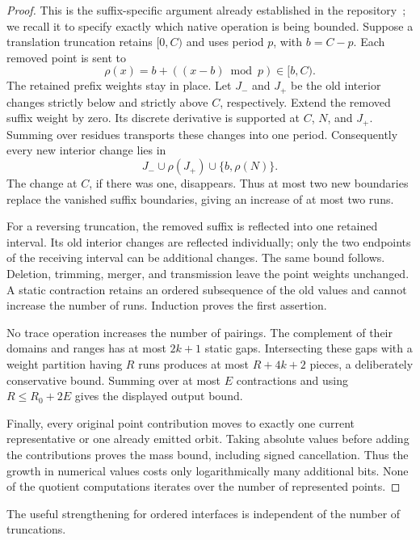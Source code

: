 \begin{proof}
This is the suffix-specific argument already established in the
repository~\cite{ProveIt2026}; we recall it to specify exactly which native
operation is being bounded.  Suppose a translation truncation retains
$[0,C)$ and uses period $p$, with $b=C-p$.  Each removed point is sent to
\[
               \rho(x)=b+((x-b)\bmod p)\in[b,C).
\]
The retained prefix weights stay in place.  Let $J_-$ and $J_+$ be the old
interior changes strictly below and strictly above $C$, respectively.
Extend the removed suffix weight by zero.  Its discrete derivative is
supported at $C$, $N$, and $J_+$.  Summing over residues transports these
changes into one period.  Consequently every new interior change lies in
\[
                   J_-\cup\rho(J_+)\cup\{b,\rho(N)\}.
\]
The change at $C$, if there was one, disappears.  Thus at most two new
boundaries replace the vanished suffix boundaries, giving an increase of at
most two runs.

For a reversing truncation, the removed suffix is reflected into one
retained interval.  Its old interior changes are reflected individually;
only the two endpoints of the receiving interval can be additional changes.
The same bound follows.  Deletion, trimming, merger, and transmission leave
the point weights unchanged.  A static contraction retains an ordered
subsequence of the old values and cannot increase the number of runs.
Induction proves the first assertion.

No trace operation increases the number of pairings.  The complement of
their domains and ranges has at most $2k+1$ static gaps.  Intersecting these
gaps with a weight partition having $R$ runs produces at most $R+4k+2$
pieces, a deliberately conservative bound.  Summing over at most $E$
contractions and using $R\le R_0+2E$ gives the displayed output bound.

Finally, every original point contribution moves to exactly one current
representative or one already emitted orbit.  Taking absolute values before
adding the contributions proves the mass bound, including signed
cancellation.  Thus the growth in numerical values costs only logarithmically
many additional bits.  None of the quotient computations iterates over the
number of represented points.
\end{proof}

The useful strengthening for ordered interfaces is independent of the
number of truncations.

